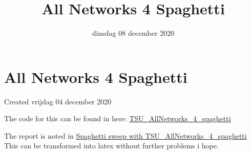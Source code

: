 \documentclass{scrartcl}
\title{All Networks 4 Spaghetti}
\date{dinsdag 08 december 2020}
\author{}
\begin{document}
\maketitle

		\section{All Networks 4 Spaghetti}

Created vrijdag 04 december 2020



The code for this can be found in here: \href{https://colab.research.google.com/drive/1kKCU9pAsVRqNR-lX1p45Z7BLTxp76CMq}{TSU\_AllNetworks\_4\_spaghetti}





The report is noted in \href{https://wandb.ai/dplars/pytorch-TWI_spaghetti_sweep/reports/Spaghetti-sweep-with-TSU_AllNetworks_4_spaghetti--VmlldzozNTIxNjM}{Spaghetti sweep with TSU\_AllNetworks\_4\_spaghetti} This can be transformed into latex without further problems i hope.
\end{document}
